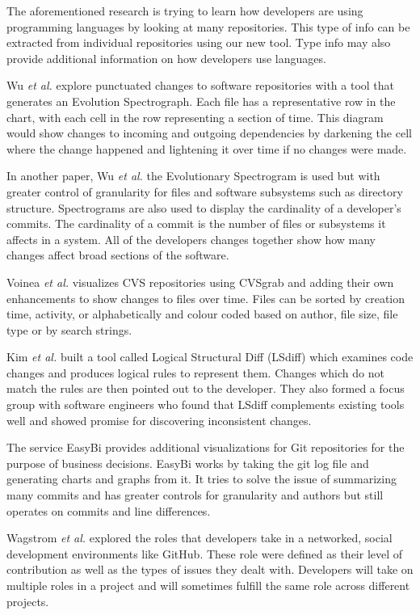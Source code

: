 \documentclass[conference]{IEEEtran}
\begin{document}
The aforementioned research is trying to learn how developers are using programming languages by looking at many repositories. This type of info can be extracted from individual repositories using our new tool. Type info may also provide additional information on how developers use languages.

Wu \textit{et al.} \cite{wu2004a} explore punctuated changes to software repositories with a tool that generates an Evolution Spectrograph. Each file has a representative row in the chart, with each cell in the row representing a section of time. This diagram would show changes to incoming and outgoing dependencies by darkening the cell where the change happened and lightening it over time if no changes were made.

In another paper, Wu \textit{et al.} \cite{wu2004} the Evolutionary Spectrogram is used but with greater control of granularity for files and software subsystems such as directory structure. Spectrograms are also used to display the cardinality of a developer’s commits. The cardinality of a commit is the number of files or subsystems it affects in a system. All of the developers changes together show how many changes affect broad sections of the software.

Voinea \textit{et al.} \cite{voinea2006} visualizes CVS repositories using CVSgrab and adding their own enhancements to show changes to files over time. Files can be sorted by creation time, activity, or alphabetically and colour coded based on author, file size, file type or by search strings.

Kim \textit{et al.} \cite{Kim:2009:DRS:1555001.1555046} built a tool called Logical Structural Diff (LSdiff) which examines code changes and produces logical rules to represent them. Changes which do not match the rules are then pointed out to the developer. They also formed a focus group with software engineers who found that LSdiff complements existing tools well and showed promise for discovering inconsistent changes.

The service EasyBi \cite{EasyBi} provides additional visualizations for Git repositories for the purpose of business decisions. EasyBi works by taking the git log file and generating charts and graphs from it. It tries to solve the issue of summarizing many commits and has greater controls for granularity and authors but still operates on commits and line differences.

Wagstrom \textit{et al.} \cite{Patrick:Wagstrom:2012} explored the roles that developers take in a networked, social development environments like GitHub. These role were defined as their level of contribution as well as the types of issues they dealt with. Developers will take on multiple roles in a project and will sometimes fulfill the same role across different projects.
\end{document}
